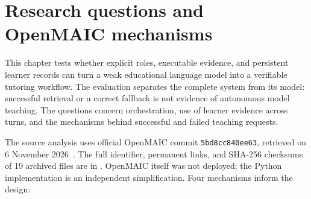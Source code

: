 \section{Research questions and OpenMAIC mechanisms}
This chapter tests whether explicit roles, executable evidence, and persistent learner records can turn a weak educational language model into a verifiable tutoring workflow. The evaluation separates the complete system from its model: successful retrieval or a correct fallback is not evidence of autonomous model teaching. The questions concern orchestration, use of learner evidence across turns, and the mechanisms behind successful and failed teaching requests.

The source analysis uses official OpenMAIC commit \texttt{5bd8cc840ee63}, retrieved on 6 November 2026~\cite{openmaic}. The full identifier, permanent links, and SHA-256 checksums of 19 archived files are in . OpenMAIC itself was not deployed; the Python implementation is an independent simplification. Four mechanisms inform the design:

